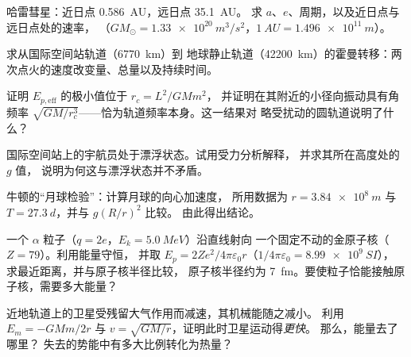 \begin{exercise}[$\star\star$]\label{exo:b1:central-forces:6}
哈雷彗星：近日点 \qty{0.586}{AU}，远日点 \qty{35.1}{AU}。
求 $a$、$e$、周期，以及近日点与远日点处的速率，
（$GM_\odot = \qty{1.33e20}{m^3/s^2}$，$\qty{1}{AU} = \qty{1.496e11}{m}$）。
\end{exercise}

\begin{exercise}[$\star\star$]\label{exo:b1:central-forces:7}
求从国际空间站轨道（\qty{6770}{km}）到
地球静止轨道（\qty{42200}{km}）的霍曼转移：两次点火的速度改变量、总量以及持续时间。
\end{exercise}

\begin{exercise}[$\star\star$]\label{exo:b1:central-forces:8}
证明 $E_{p,\mathrm{eff}}$ 的极小值位于 $r_c = L^2/GMm^2$，
并证明在其附近的小径向振动具有角频率
$\sqrt{GM/r_c^3}$——恰为轨道频率本身。这一结果对
略受扰动的圆轨道说明了什么？
\end{exercise}

\begin{exercise}[$\star\star$]\label{exo:b1:central-forces:9}
国际空间站上的宇航员处于漂浮状态。试用受力分析解释，
并求其所在高度处的 $g$ 值，
说明为何这与漂浮状态并不矛盾。
\end{exercise}

\begin{exercise}[$\star\star\star$]\label{exo:b1:central-forces:10}
牛顿的“月球检验”：计算月球的向心加速度，
所用数据为 $r = \qty{3.84e8}{m}$ 与 $T = \qty{27.3}{d}$，并与 $g(R/r)^2$ 比较。
由此得出结论。
\end{exercise}

\begin{exercise}[$\star\star\star$]\label{exo:b1:central-forces:11}
一个 $\alpha$ 粒子（$q = 2e$，$E_k = \qty{5.0}{MeV}$）沿直线射向
一个固定不动的金原子核（$Z = 79$）。利用能量守恒，
并取 $E_p = 2Ze^2/4\pi\varepsilon_0r$（$1/4\pi\varepsilon_0 = \qty{8.99e9}{SI}$），
求最近距离，并与原子核半径比较，
原子核半径约为 \qty{7}{fm}。要使粒子恰能接触原子核，需要多大能量？
\end{exercise}

\begin{exercise}[$\star\star\star$]\label{exo:b1:central-forces:12}
近地轨道上的卫星受残留大气作用而减速，其机械能随之减小。
利用 $E_m = -GMm/2r$ 与 $v = \sqrt{GM/r}$，证明此时卫星运动得\emph{更快}。
那么，能量去了哪里？
失去的势能中有多大比例转化为热量？
\end{exercise}

